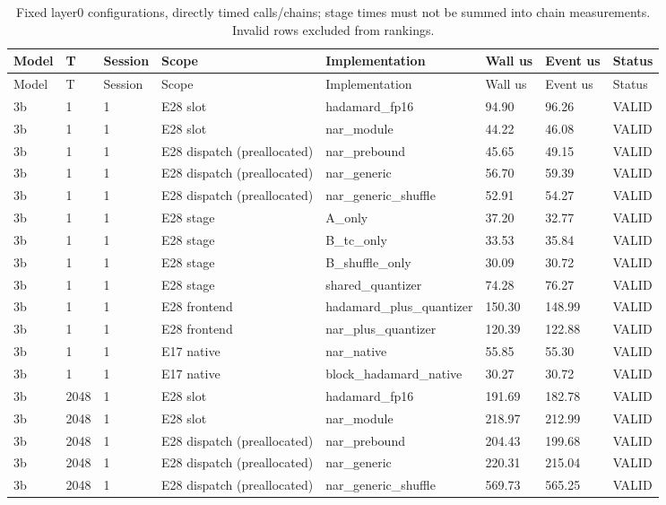 {\small
\begin{longtable}{llllllll}
\caption{Fixed layer0 configurations, directly timed calls/chains; stage times must not be summed into chain measurements. Invalid rows excluded from rankings.} \\
\toprule
Model & T & Session & Scope & Implementation & Wall us & Event us & Status \\
\midrule
\endfirsthead
\toprule
Model & T & Session & Scope & Implementation & Wall us & Event us & Status \\
\midrule
\endhead
3b & 1 & 1 & E28 slot & hadamard\_fp16 & 94.90 & 96.26 & VALID \\
3b & 1 & 1 & E28 slot & nar\_module & 44.22 & 46.08 & VALID \\
3b & 1 & 1 & E28 dispatch (preallocated) & nar\_prebound & 45.65 & 49.15 & VALID \\
3b & 1 & 1 & E28 dispatch (preallocated) & nar\_generic & 56.70 & 59.39 & VALID \\
3b & 1 & 1 & E28 dispatch (preallocated) & nar\_generic\_shuffle & 52.91 & 54.27 & VALID \\
3b & 1 & 1 & E28 stage & A\_only & 37.20 & 32.77 & VALID \\
3b & 1 & 1 & E28 stage & B\_tc\_only & 33.53 & 35.84 & VALID \\
3b & 1 & 1 & E28 stage & B\_shuffle\_only & 30.09 & 30.72 & VALID \\
3b & 1 & 1 & E28 stage & shared\_quantizer & 74.28 & 76.27 & VALID \\
3b & 1 & 1 & E28 frontend & hadamard\_plus\_quantizer & 150.30 & 148.99 & VALID \\
3b & 1 & 1 & E28 frontend & nar\_plus\_quantizer & 120.39 & 122.88 & VALID \\
3b & 1 & 1 & E17 native & nar\_native & 55.85 & 55.30 & VALID \\
3b & 1 & 1 & E17 native & block\_hadamard\_native & 30.27 & 30.72 & VALID \\
3b & 2048 & 1 & E28 slot & hadamard\_fp16 & 191.69 & 182.78 & VALID \\
3b & 2048 & 1 & E28 slot & nar\_module & 218.97 & 212.99 & VALID \\
3b & 2048 & 1 & E28 dispatch (preallocated) & nar\_prebound & 204.43 & 199.68 & VALID \\
3b & 2048 & 1 & E28 dispatch (preallocated) & nar\_generic & 220.31 & 215.04 & VALID \\
3b & 2048 & 1 & E28 dispatch (preallocated) & nar\_generic\_shuffle & 569.73 & 565.25 & VALID \\

\end{longtable}}
